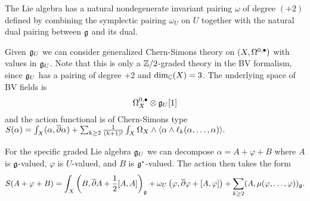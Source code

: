 \documentclass[10pt, oneside]{article}
\begin{document}
The Lie algebra has a natural nondegenerate invariant pairing $\omega$ of degree $(+2)$ defined by combining the symplectic pairing $\omega_U$ on $U$ together with the natural dual pairing between $\mathfrak g$ and its dual. 

Given $\mathfrak g_U$ we can consider generalized Chern-Simons theory on $(X, \Omega^{0,\bullet})$ with values in $\mathfrak g_U$.
Note that this is only a $\mathbb Z/2$-graded theory in the BV formalism, since $\mathfrak g_U$ has a pairing of degree $+2$ and $\dim_\mathbb C (X) = 3$. 
The underlying space of BV fields is 
\[
\Omega^{0,\bullet}_X \otimes \mathfrak g_U [1]
\]
and the action functional is of Chern-Simons type $S(\alpha) = \int_X (\alpha, \overline{\partial} \alpha) + \sum_{k\geq 2}\frac{1}{(k+1)!} \int_{X} \Omega_X\wedge \langle \alpha \wedge \ell_k(\alpha, \dots, \alpha)\rangle.$

For the specific graded Lie algebra $\mathfrak g_U$ we can decompose $\alpha = A + \varphi + B$ where $A$ is $\mathfrak g$-valued, $\varphi$ is $U$-valued, and $B$ is $\mathfrak g^*$-valued.
The action then takes the form
\[
S(A + \varphi + B) = \int_X \left(B, \overline{\partial} A + \frac{1}{2} [A,A] \right)_\mathfrak g + \omega_U \left(\varphi, \overline{\partial} \varphi + [A, \varphi] \right) + \sum_{k\geq 2} (A, \mu(\varphi, \ldots, \varphi))_\mathfrak g .
\]
\end{document}
